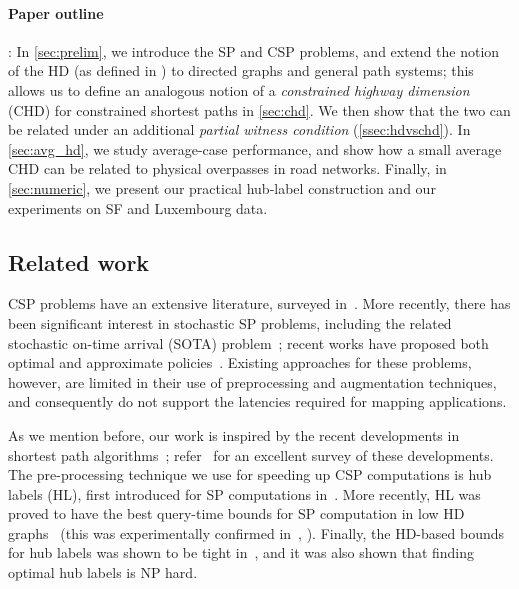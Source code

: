 \documentclass[opre,nonblindrev]{informs3} %
\begin{document}
\paragraph{Paper outline}:
In \cref{sec:prelim}, we introduce the SP and CSP problems, and extend the notion of the HD (as defined in \citep{highway2013}) to directed graphs and general path systems; this allows us to define an analogous notion of a \emph{constrained highway dimension} (CHD) for constrained shortest paths in \cref{sec:chd}. 
We then show that the two can be related under an additional \emph{partial witness condition} (\cref{ssec:hdvschd}). 
In \cref{sec:avg_hd}, we study average-case performance, and show how a small average CHD can be related to physical overpasses in road networks. 
Finally, in \cref{sec:numeric}, we present our practical hub-label construction and our experiments on SF and Luxembourg data.


\subsection{Related work}

CSP problems have an extensive literature, surveyed in~\citep{csp_survey}. 
More recently, there has been significant interest in stochastic SP problems, including the related stochastic on-time arrival (SOTA) problem~\citep{fan2005arriving}; recent works have proposed both optimal and approximate policies~\citep{sabran2014precomputation,nikolova_discretization}. 
Existing approaches for these problems, however, are limited in their use of preprocessing and augmentation techniques, and consequently do not support the latencies required for mapping applications.

As we mention before, our work is inspired by the recent developments in shortest path algorithms~\citep{highway2013,hubimplem,highway2010,dimacs09,geisberger_ch_definition,skeleton}; refer~\citep{goldberg_survey} for an excellent survey of these developments. 
The pre-processing technique we use for speeding up CSP computations is hub labels (HL), first introduced for SP computations in~\citep{cohen_definition_hl}. 
More recently, HL was proved to have the best query-time bounds for SP computation in low HD graphs~\citep{highway2013,highway2010} (this was experimentally confirmed in~\citep{hubimplem}, \cite[Figure 7]{goldberg_survey}).  
Finally, the HD-based bounds for hub labels was shown to be tight in~\citep{babenko_hl_complexity,white_complexity_hd}, and it was also shown that finding optimal hub labels is NP hard.
\end{document}
